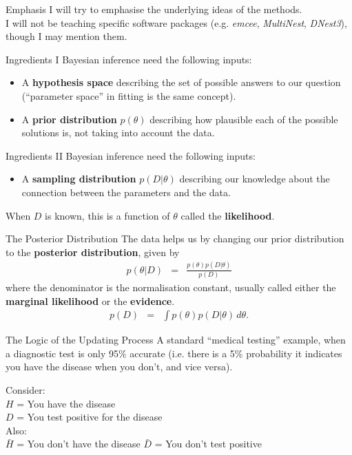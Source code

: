 \begin{frame}[t]{Emphasis}
I will try to emphasise the underlying ideas of the methods.\\
I will not
be teaching specific software packages
(e.g. {\it emcee}, {\it MultiNest}, {\it DNest3}), though I may mention them.
\end{frame}

\begin{frame}[t]{Ingredients I}
Bayesian inference need the following inputs:

\begin{itemize}
\setlength{\itemsep}{20pt}
\item A {\bf hypothesis space} describing the set of possible answers to our
question (``parameter space'' in fitting is the same concept).
\item A {\bf prior distribution} $p(\theta)$ describing how plausible
each of the possible solutions is, not taking into account the data.
\end{itemize}
\end{frame}

\begin{frame}[t]{Ingredients II}
Bayesian inference need the following inputs:
\begin{itemize}
\item A {\bf sampling distribution} $p(D | \theta)$ describing our knowledge
about the connection between the parameters and the data.
\end{itemize}

When $D$ is known,
this is a function of $\theta$ called the {\bf likelihood}.
\end{frame}


\begin{frame}[t]{The Posterior Distribution}
The data helps us by changing our prior distribution to the {\bf posterior
distribution}, given by
\begin{eqnarray}
p(\theta | D) &=& \frac{p(\theta) p(D|\theta)}{p(D)}
\end{eqnarray}
where the denominator is the normalisation constant, usually called either
the {\bf marginal likelihood} or the {\bf evidence}.
\begin{eqnarray}
p(D) &=& \int p(\theta)p(D|\theta) \, d\theta.
\end{eqnarray}

\end{frame}


\begin{frame}[t]{The Logic of the Updating Process}
A standard ``medical testing'' example, when a diagnostic test is only
95\% accurate (i.e. there is a 5\% probability it indicates you have
the disease when you don't, and vice versa).

Consider:\\
$H$ = You have the disease\\
$D$ = You test positive for the disease\\

Also:\\
$\bar{H}$ = You don't have the disease
$\bar{D}$ = You don't test positive

\end{frame}




